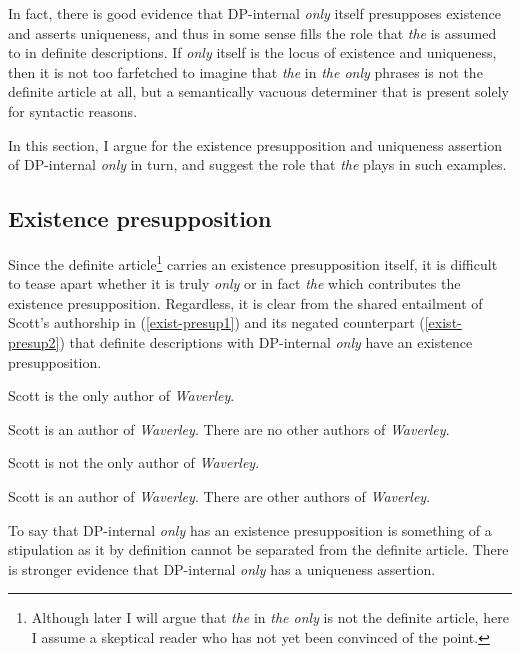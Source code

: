 In fact, there is good evidence that DP-internal \textit{only} itself presupposes existence and asserts uniqueness, and thus in some sense fills the role that \textit{the} is assumed to in definite descriptions. If \textit{only} itself is the locus of existence and uniqueness, then it is not too farfetched to imagine that \textit{the} in \textit{the only} phrases is not the definite article at all, but a semantically vacuous determiner that is present solely for syntactic reasons.

In this section, I argue for the existence presupposition and uniqueness assertion of DP-internal \textit{only} in turn, and suggest the role that \textit{the} plays in such examples.

\subsection{Existence presupposition}
Since the definite article\footnote{Although later I will argue that \textit{the} in \textit{the only} is not the definite article, here I assume a skeptical reader who has not yet been convinced of the point.} carries an existence presupposition itself, it is difficult to tease apart whether it is truly \textit{only} or in fact \textit{the} which contributes the existence presupposition. Regardless, it is clear from the shared entailment of Scott's authorship in (\ref{exist-presup1}) and its negated counterpart (\ref{exist-presup2}) that definite descriptions with DP-internal \textit{only} have an existence presupposition.

\begin{exe}
	\ex \label{exist-presup1} Scott is the only author of \textit{Waverley}.
		\begin{xlist}
			\ex Scott is an author of \textit{Waverley}.
			\ex There are no other authors of \textit{Waverley}.
		\end{xlist}
	\ex \label{exist-presup2} Scott is not the only author of \textit{Waverley}.
		\begin{xlist}
			\ex Scott is an author of \textit{Waverley}.
			\ex There are other authors of \textit{Waverley}.
		\end{xlist}
\end{exe}

To say that DP-internal \textit{only} has an existence presupposition is something of a stipulation as it by definition cannot be separated from the definite article. There is stronger evidence that DP-internal \textit{only} has a uniqueness assertion.

